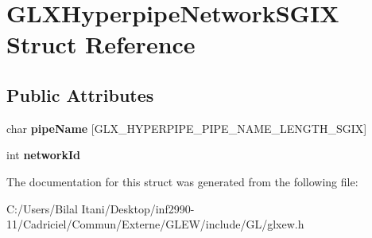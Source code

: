 \hypertarget{struct_g_l_x_hyperpipe_network_s_g_i_x}{}\section{G\+L\+X\+Hyperpipe\+Network\+S\+G\+IX Struct Reference}
\label{struct_g_l_x_hyperpipe_network_s_g_i_x}
\subsection*{Public Attributes}
\begin{DoxyCompactItemize}
\item 
char {\bfseries pipe\+Name} \mbox{[}G\+L\+X\+\_\+\+H\+Y\+P\+E\+R\+P\+I\+P\+E\+\_\+\+P\+I\+P\+E\+\_\+\+N\+A\+M\+E\+\_\+\+L\+E\+N\+G\+T\+H\+\_\+\+S\+G\+IX\mbox{]}\hypertarget{struct_g_l_x_hyperpipe_network_s_g_i_x_a6338b9717fa895aec16b932f2ef693ed}{}\label{struct_g_l_x_hyperpipe_network_s_g_i_x_a6338b9717fa895aec16b932f2ef693ed}

\item 
int {\bfseries network\+Id}\hypertarget{struct_g_l_x_hyperpipe_network_s_g_i_x_a81393053988b32fadb0b21615024add1}{}\label{struct_g_l_x_hyperpipe_network_s_g_i_x_a81393053988b32fadb0b21615024add1}

\end{DoxyCompactItemize}


The documentation for this struct was generated from the following file\+:\begin{DoxyCompactItemize}
\item 
C\+:/\+Users/\+Bilal Itani/\+Desktop/inf2990-\/11/\+Cadriciel/\+Commun/\+Externe/\+G\+L\+E\+W/include/\+G\+L/glxew.\+h\end{DoxyCompactItemize}
